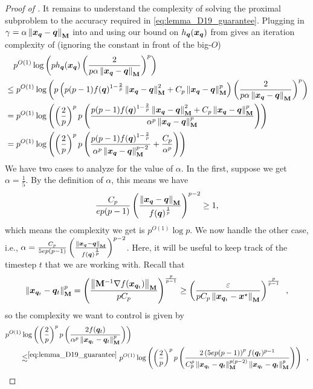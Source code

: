 \begin{proof}[Proof of ]
It remains to understand the complexity of solving the proximal subproblem to the accuracy required in \eqref{eq:lemma_D19_guarantee}. Plugging in $\gamma = \alpha\left\lVert \bm{x}_{\bm{q}}-\bm{q} \right\rVert_{\mathbf{M}}$  into  and using our bound on $h_{\bm{q}}(\bm{x}_{\bm{q}})$ from  gives an iteration complexity of (ignoring the constant in front of the big-$O$)
\begin{align*}
    &\quad p^{O(1)}\log\left(ph_{\bm{q}}(\bm{x}_{\bm{q}})\left(\frac{2}{p\alpha\left\lVert \bm{x}_{\bm{q}}-\bm{q} \right\rVert_{\mathbf{M}}}\right)^{p}\right) \\
    &\le p^{O(1)}\log\left(p\left(p(p-1)f(\bm{q})^{1-\frac{2}{p}}\left\lVert \bm{x}_{\bm{q}}-\bm{q} \right\rVert_{\mathbf{M}}^2 + C_p\left\lVert \bm{x}_{\bm{q}}-\bm{q} \right\rVert_{\mathbf{M}}^p\right)\left(\frac{2}{p\alpha\left\lVert \bm{x}_{\bm{q}}-\bm{q} \right\rVert_{\mathbf{M}}}\right)^{p}\right) \\
    &= p^{O(1)}\log\left(\left(\frac{2}{p}\right)^{p} p\left(\frac{p(p-1)f(\bm{q})^{1-\frac{2}{p}}\left\lVert \bm{x}_{\bm{q}}-\bm{q} \right\rVert_{\mathbf{M}}^2 + C_p\left\lVert \bm{x}_{\bm{q}}-\bm{q} \right\rVert_{\mathbf{M}}^p}{\alpha^p\left\lVert \bm{x}_{\bm{q}}-\bm{q} \right\rVert_{\mathbf{M}}^p}\right)\right) \\
    &= p^{O(1)}\log\left(\left(\frac{2}{p}\right)^{p} p\left(\frac{p(p-1)f(\bm{q})^{1-\frac{2}{p}}}{\alpha^p\left\lVert \bm{x}_{\bm{q}}-\bm{q} \right\rVert_{\mathbf{M}}^{p-2}} + \frac{C_p}{\alpha^p}\right)\right)
\end{align*}
We have two cases to analyze for the value of $\alpha$. In the first, suppose we get $\alpha = \frac{1}{5}$. By the definition of $\alpha$, this means we have
\begin{align*}
    \frac{C_p}{ep(p-1)}\left(\frac{\left\lVert \bm{x}_{\bm{q}}-\bm{q} \right\rVert_{\mathbf{M}}}{f(\bm{q})^{\frac{1}{p}}}\right)^{p-2} \ge 1,
\end{align*}
which means the complexity we get is $p^{O(1)}\log p$. We now handle the other case, i.e., $\alpha=\frac{C_p}{5ep(p-1)}\left(\frac{\left\lVert \bm{x}_{\bm{q}}-\bm{q} \right\rVert_{\mathbf{M}}}{f(\bm{q})^{\frac{1}{p}}}\right)^{p-2}$. Here, it will be useful to keep track of the timestep $t$ that we are working with. Recall that
\begin{align}
    \left\lVert \bm{x}_{\bm{q}_t}-\bm{q}_t \right\rVert_{\mathbf{M}}^p = \left(\frac{\left\lVert \mathbf{M}^{-1}\nabla f(\bm{x}_{\bm{q}_t}) \right\rVert_{\mathbf{M}}}{pC_p}\right)^{\frac{p}{p-1}} \ge \left(\frac{\varepsilon}{pC_p\left\lVert \bm{x}_{\bm{q}_t}-\bm{x}^{\star} \right\rVert_{\mathbf{M}}}\right)^{\frac{p}{p-1}}\enspace,\label{eq:xq_lb}
\end{align}
so the complexity we want to control is given by
\begin{align*}
    &p^{O(1)}\logv{\inparen{\frac{2}{p}}^p p\inparen{\frac{2f(\vq_t)}{\alpha^p\norm{\vx_{\vq_t}-\vq_t}_{\mM}^{p}}}}\\ &\qquad\lesssim^{\eqref{eq:lemma_D19_guarantee}} p^{O(1)}\logv{\inparen{\frac{2}{p}}^p p\inparen{\frac{2\inparen{5ep(p-1)}^{p}f(\vq_t)^{p-1}}{C_p^p\norm{\vx_{\vq_t}-\vq_t}_{\mM}^{p(p-2)}\norm{\vx_{\vq_t}-\vq_t}_{\mM}^{p}}}}\enspace,\\

\end{align*}
\end{proof}

